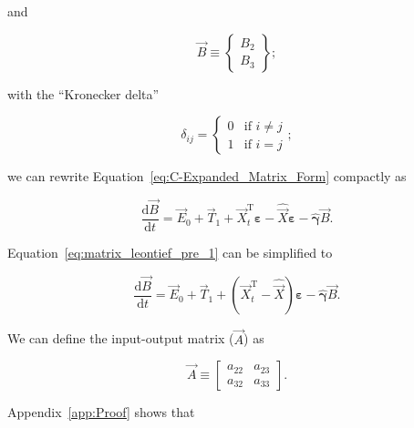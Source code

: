 \noindent{}and

\begin{equation} \label{eq:B_vec_def}
	\vec{B} 
	\equiv
	\begin{Bmatrix}	
		B_{2} \\
		B_{3}
	\end{Bmatrix};
\end{equation}

\noindent{}with the ``Kronecker delta''

\begin{equation}\label{eq:k_delta}
	\delta_{ij} 
	=
	\begin{cases}	
		0	&	\text{if  } i \neq j	\\
		1 	& 	\text{if  } i = j
	\end{cases};
\end{equation}

\noindent{}we can rewrite Equation~\ref{eq:C-Expanded_Matrix_Form}
compactly as

\begin{equation} \label{eq:matrix_leontief_pre_1}
	\frac{\mathrm{d}\vec{B}}{\mathrm{d}t} 
	= \vec{E}_{0}
	+ \vec{T}_{1}
	+ \vec{X}_{t}^{\mathrm{T}}\bm{\varepsilon} 
	- \hat{\vec{X}}\bm{\varepsilon}
	- \hat{\bm{\gamma}}\vec{B}.
\end{equation}

\noindent{}Equation~\ref{eq:matrix_leontief_pre_1} can be simplified to

\begin{equation} \label{eq:matrix_leontief_pre_2}
	\frac{\mathrm{d}\vec{B}}{\mathrm{d}t} 
	= \vec{E}_{0}
	+ \vec{T}_{1}
	+ (\vec{X}_{t}^{\mathrm{T}} - \hat{\vec{X}})\bm{\varepsilon} 
	- \hat{\bm{\gamma}}\vec{B}.
\end{equation}

\noindent{}We can define the input-output matrix ($\vec{A}$) as

\begin{equation} \label{eq:A_matrix_def}
	\vec{A} 
	\equiv
	\begin{bmatrix}
		a_{22} & a_{23}	\\
		a_{32} & a_{33}	
	\end{bmatrix}.
\end{equation} 

\noindent{}Appendix~\ref{app:Proof} shows that

